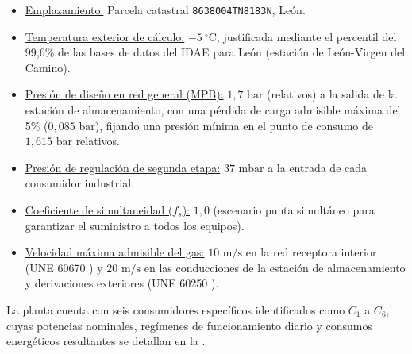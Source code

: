 \documentclass[12pt]{article}
\begin{document}
        \begin{itemize}
            \item \underline{Emplazamiento:} Parcela catastral \texttt{8638004TN8183N}, León.
            \item \underline{Temperatura exterior de cálculo:} $-5\ ^{\circ}\text{C}$, justificada mediante el percentil del 99,6\% de las bases de datos del IDAE \cite{idaeclima} para León (estación de León-Virgen del Camino).
            \item \underline{Presión de diseño en red general (MPB):} $1,7\text{ bar}$ (relativos) a la salida de la estación de almacenamiento, con una pérdida de carga admisible máxima del 5\% ($0,085\text{ bar}$), fijando una presión mínima en el punto de consumo de $1,615\text{ bar}$ relativos.
            \item \underline{Presión de regulación de segunda etapa:} $37\text{ mbar}$ a la entrada de cada consumidor industrial.
            \item \underline{Coeficiente de simultaneidad ($f_s$):} $1,0$ (escenario punta simultáneo para garantizar el suministro a todos los equipos).
            \item \underline{Velocidad máxima admisible del gas:} $10\text{ m/s}$ en la red receptora interior (UNE 60670 \cite{une60670}) y $20\text{ m/s}$ en las conducciones de la estación de almacenamiento y derivaciones exteriores (UNE 60250 \cite{une60250}).
        \end{itemize}

        La planta cuenta con seis consumidores específicos identificados como $C_1$ a $C_6$, cuyas potencias nominales, regímenes de funcionamiento diario y consumos energéticos resultantes se detallan en la .
\end{document}
